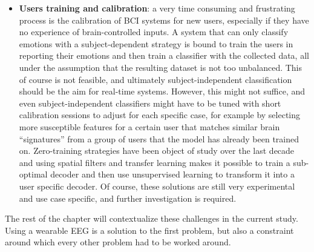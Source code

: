 \begin{itemize}
\item 	\textbf{Users training and calibration}: a very time consuming and frustrating process is the calibration of \ac{BCI} systems for new users, especially if they have no experience of brain-controlled inputs. A system that can only classify emotions with a subject-dependent strategy is bound to train the users in reporting their emotions and then train a classifier with the collected data, all under the assumption that the resulting dataset is not too unbalanced. This of course is not feasible, and ultimately subject-independent classification should be the aim for real-time systems. However, this might not suffice, and even subject-independent classifiers might have to be tuned with short calibration sessions to adjust for each specific case, for example by selecting more susceptible features for a certain user that matches similar brain “signatures” from a group of users that the model has already been trained on. Zero-training strategies \cite{krauledat_towards_2008,jeong_hybrid_2021} have been object of study over the last decade and using spatial filters and transfer learning makes it possible to train a sub-optimal decoder and then use unsupervised learning to transform it into a user specific decoder. Of course, these solutions are still very experimental and use case specific, and further investigation is required.
\end{itemize}

The rest of the chapter will contextualize these challenges in the current study. Using a wearable EEG is a solution to the first problem, but also a constraint around which every other problem had to be worked around.

